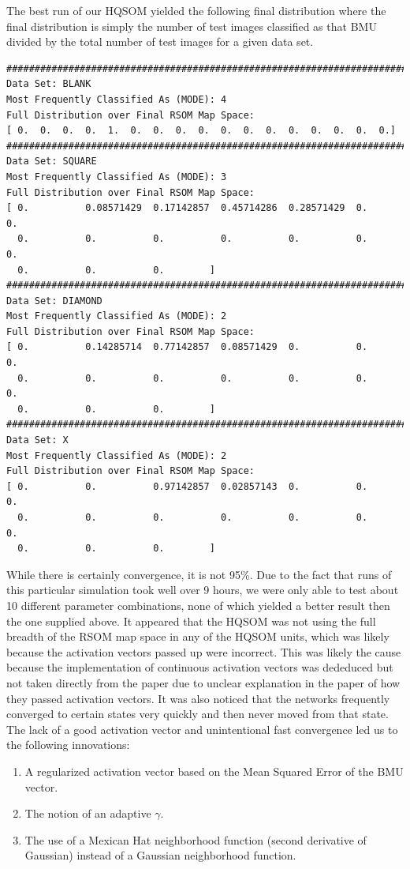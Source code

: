 \documentclass[a4paper,10pt]{article}
\begin{document}
The best
run of our HQSOM yielded the following final distribution where the final distribution is simply the
number of test images classified as that BMU divided by the total number of test images for a given
data set.

\begin{center}
\small
\begin{verbatim}
################################################################################
Data Set: BLANK
Most Frequently Classified As (MODE): 4
Full Distribution over Final RSOM Map Space:
[ 0.  0.  0.  0.  1.  0.  0.  0.  0.  0.  0.  0.  0.  0.  0.  0.  0.]
################################################################################
Data Set: SQUARE
Most Frequently Classified As (MODE): 3
Full Distribution over Final RSOM Map Space:
[ 0.          0.08571429  0.17142857  0.45714286  0.28571429  0.          0.
  0.          0.          0.          0.          0.          0.          0.
  0.          0.          0.        ]
################################################################################
Data Set: DIAMOND
Most Frequently Classified As (MODE): 2
Full Distribution over Final RSOM Map Space:
[ 0.          0.14285714  0.77142857  0.08571429  0.          0.          0.
  0.          0.          0.          0.          0.          0.          0.
  0.          0.          0.        ]
################################################################################
Data Set: X
Most Frequently Classified As (MODE): 2
Full Distribution over Final RSOM Map Space:
[ 0.          0.          0.97142857  0.02857143  0.          0.          0.
  0.          0.          0.          0.          0.          0.          0.
  0.          0.          0.        ]

\end{verbatim} 
\end{center}

While there is certainly convergence, it is not 95\%.  Due to the fact that runs of this particular
simulation took well over 9 hours, we were only able to test about 10 different
parameter combinations, none of which yielded a better result then the one supplied above.  It
appeared that the HQSOM was not using the full breadth of the RSOM map space in any of the HQSOM
units, which was likely because the activation vectors passed up were incorrect.  This was likely
the cause because the implementation of continuous activation vectors was dededuced but not taken
directly from the paper due to unclear explanation in the paper of how they passed activation
vectors.  It was also noticed that the networks frequently converged to certain states very quickly
and then never moved from that state.  The lack of a good activation vector and unintentional fast
convergence
led us to the following innovations:
\begin{enumerate}
\item A regularized activation vector based on the Mean Squared Error of the BMU vector.
\item The notion of an adaptive $\gamma$.
\item The use of a Mexican Hat neighborhood function (second derivative of Gaussian) instead of a
Gaussian neighborhood function.
\end{enumerate}
 
\end{document}
